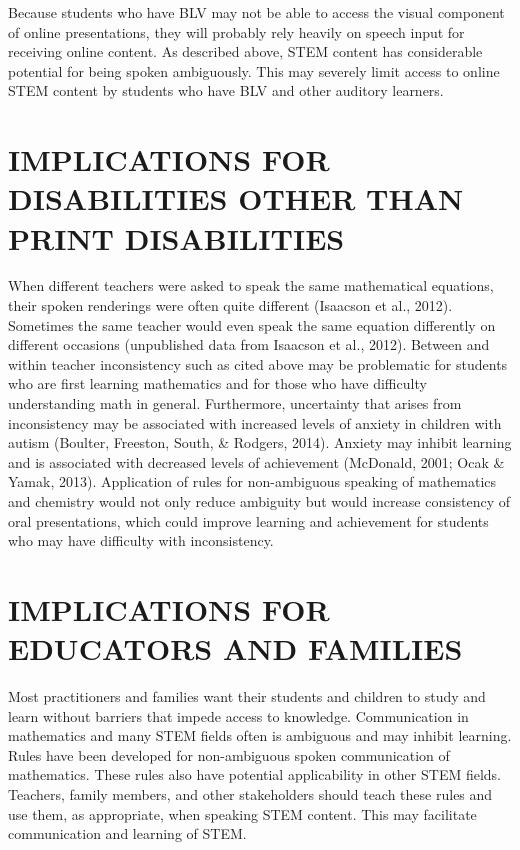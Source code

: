 \documentclass[11.5pt]{sig-alternate} %
\begin{document}
\begin{large}
Because students who have BLV may not be able to access the visual component of online presentations, they will probably rely heavily on speech input for receiving online content. As described above, STEM content has considerable potential for being spoken ambiguously. This may severely limit access to online STEM content by students who have BLV and other auditory learners. 

\section*{IMPLICATIONS FOR DISABILITIES OTHER THAN PRINT DISABILITIES}

When different teachers were asked to speak the same mathematical equations, their spoken renderings were often quite different (Isaacson et al., 2012). Sometimes the same teacher would even speak the same equation differently on different occasions (unpublished data from Isaacson et al., 2012). Between and within teacher inconsistency such as cited above may be problematic for students who are first learning mathematics and for those who have difficulty understanding math in general. Furthermore, uncertainty that arises from inconsistency may be associated with increased levels of anxiety in children with autism (Boulter, Freeston, South, \& Rodgers, 2014). Anxiety may inhibit learning and is associated with decreased levels of achievement (McDonald, 2001; Ocak \& Yamak, 2013). Application of rules for non-ambiguous speaking of mathematics and chemistry would not only reduce ambiguity but would increase consistency of oral presentations, which could improve learning and achievement for students who may have difficulty with inconsistency. 

 
\section*{IMPLICATIONS FOR EDUCATORS AND FAMILIES}

Most practitioners and families want their students and children to study and learn without barriers that impede access to knowledge. Communication in mathematics and many STEM fields often is ambiguous and may inhibit learning. Rules have been developed for non-ambiguous spoken communication of mathematics. These rules also have potential applicability in other STEM fields. Teachers, family members, and other stakeholders should teach these rules and use them, as appropriate, when speaking STEM content. This may facilitate communication and learning of STEM.   


\end{large}
\end{document}
